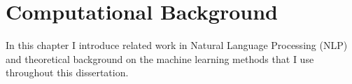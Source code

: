 \chapter{Computational Background}\label{chap:nlp}

\ifpdf
    \graphicspath{{Chapter3/Figs/Raster/}{Chapter3/Figs/PDF/}{Chapter3/Figs/}}
\else
    \graphicspath{{Chapter3/Figs/Vector/}{Chapter3/Figs/}}
\fi

In this chapter I introduce related work in Natural Language Processing (NLP) and theoretical background on the machine learning methods that I use throughout this dissertation.

%
%
%
